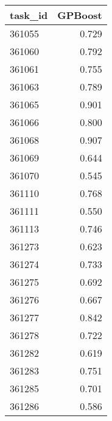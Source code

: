 \begin{tabular}{lr}
\toprule
task\_id & GPBoost \\
\midrule
361055 & 0.729 \\
361060 & 0.792 \\
361061 & 0.755 \\
361063 & 0.789 \\
361065 & 0.901 \\
361066 & 0.800 \\
361068 & 0.907 \\
361069 & 0.644 \\
361070 & 0.545 \\
361110 & 0.768 \\
361111 & 0.550 \\
361113 & 0.746 \\
361273 & 0.623 \\
361274 & 0.733 \\
361275 & 0.692 \\
361276 & 0.667 \\
361277 & 0.842 \\
361278 & 0.722 \\
361282 & 0.619 \\
361283 & 0.751 \\
361285 & 0.701 \\
361286 & 0.586 \\
\bottomrule
\end{tabular}
